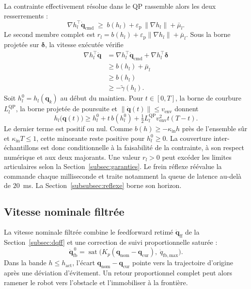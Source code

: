 La contrainte effectivement résolue dans le QP rassemble alors les deux resserrements :
\begin{equation}\label{eq:constraint_full}
\nabla h_l^{\top}\dot{\mathbf{q}}_{\mathrm{cmd}} \;\geq\; b(h_l) + \varepsilon_{\mathrm{p}}\,\|\nabla h_l\| + \bar{\mu}_l.
\end{equation}
Le second membre complet est $r_l=b(h_l)+\varepsilon_{\mathrm{p}}\|\nabla h_l\|+\bar{\mu}_l$. Sous la borne projetée sur $\boldsymbol{\delta}$, la vitesse exécutée vérifie
\begin{equation}\label{eq:implication_cbf}
\begin{aligned}
\nabla h_l^{\top}\dot{\mathbf{q}}
&=\nabla h_l^{\top}\dot{\mathbf{q}}_{\mathrm{cmd}}
+\nabla h_l^{\top}\boldsymbol{\delta} \\
&\geq b(h_l)+\bar{\mu}_l \\
&\geq b(h_l) \\
&\geq-\widetilde{\gamma}(h_l).
\end{aligned}
\end{equation}
Soit $h_l^0=h_l(\mathbf{q}_k)$ au début du maintien. Pour $t\in[0,T]$, la borne de courbure $L_l^{\mathrm{QP}}$, la borne projetée de poursuite et $\|\dot{\mathbf{q}}(t)\|\leq v_{\mathrm{env}}$ donnent
\begin{equation}\label{eq:sampled_lower_bound}
h_l\bigl(\mathbf{q}(t)\bigr)
\geq h_l^0+t\,b(h_l^0)
+\tfrac{1}{2}L_l^{\mathrm{QP}}v_{\mathrm{env}}^2t(T-t).
\end{equation}
Le dernier terme est positif ou nul. Comme $b(h)\geq-\kappa_{\mathrm{in}}h$ près de l'ensemble sûr et $\kappa_{\mathrm{in}}T\leq1$, cette minorante reste positive pour $h_l^0\geq0$. La couverture inter-échantillons est donc conditionnelle à la faisabilité de la contrainte, à son respect numérique et aux deux majorants. Une valeur $r_l>0$ peut excéder les limites articulaires selon la Section~\ref{subsec:garanties}. Le frein réflexe réévalue la commande chaque milliseconde et traite notamment la queue de latence au-delà de $20$~ms. La Section~\ref{subsubsec:reflexe} borne son horizon.

\subsection{Vitesse nominale filtrée}\label{subsec:vitesse_nominale}
La vitesse nominale filtrée combine le feedforward retimé $\dot{\mathbf{q}}_{\mathrm{ff}}$ de la Section~\ref{subsec:dqff} et une correction de suivi proportionnelle saturée :
\begin{equation}
\dot{\mathbf{q}}_{\mathrm{fb}}^{\,0} = \operatorname{sat}\!\big( K_p(\mathbf{q}_{\mathrm{nom}}-\mathbf{q}_{\mathrm{cur}}),\; \dot{q}_{\mathrm{fb,max}} \big).
\end{equation}
Dans la bande $h \leq h_{\mathrm{act}}$, l'écart $\mathbf{q}_{\mathrm{nom}}-\mathbf{q}_{\mathrm{cur}}$ pointe vers la trajectoire d'origine après une déviation d'évitement. Un retour proportionnel complet peut alors ramener le robot vers l'obstacle et l'immobiliser à la frontière.

